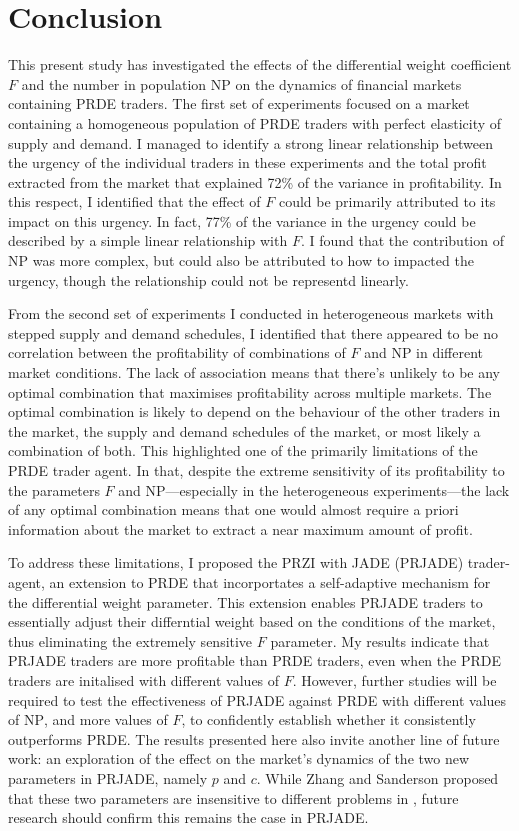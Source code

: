 \documentclass[conference]{IEEEtran}
\begin{document}
\section{Conclusion}

This present study has investigated the effects of the differential weight coefficient $F$ and the number in population $\mathrm{NP}$ on the dynamics of financial markets containing PRDE traders.
The first set of experiments focused on a market containing a homogeneous population of PRDE traders with perfect elasticity of supply and demand.
I managed to identify a strong linear relationship between the urgency of the individual traders in these experiments and the total profit extracted from the market that explained 72\% of the variance in profitability.
In this respect, I identified that the effect of $F$ could be primarily attributed to its impact on this urgency.
In fact, 77\% of the variance in the urgency could be described by a simple linear relationship with $F$.
I found that the contribution of $\mathrm{NP}$ was more complex, but could also be attributed to how to impacted the urgency, though the relationship could not be representd linearly.

From the second set of experiments I conducted in heterogeneous markets with stepped supply and demand schedules, I identified that there appeared to be no correlation between the profitability of combinations of $F$ and $\mathrm{NP}$ in different market conditions.
The lack of association means that there's unlikely to be any optimal combination that maximises profitability across multiple markets.
The optimal combination is likely to depend on the behaviour of the other traders in the market, the supply and demand schedules of the market, or most likely a combination of both.
This highlighted one of the primarily limitations of the PRDE trader agent.
In that, despite the extreme sensitivity of its profitability to the parameters $F$ and $\mathrm{NP}$---especially in the heterogeneous experiments---the lack of any optimal combination means that one would almost require a priori information about the market to extract a near maximum amount of profit.

To address these limitations, I proposed the PRZI with JADE (PRJADE) trader-agent, an extension to PRDE that incorportates a self-adaptive mechanism for the differential weight parameter.
This extension enables PRJADE traders to essentially adjust their differntial weight based on the conditions of the market, thus eliminating the extremely sensitive $F$ parameter.
My results indicate that PRJADE traders are more profitable than PRDE traders, even when the PRDE traders are initalised with different values of $F$.
However, further studies will be required to test the effectiveness of PRJADE against PRDE with different values of $\mathrm{NP}$, and more values of $F$, to confidently establish whether it consistently outperforms PRDE.
The results presented here also invite another line of future work: an exploration of the effect on the market's dynamics of the two new parameters in PRJADE, namely $p$ and $c$.
While Zhang and Sanderson proposed that these two parameters are insensitive to different problems in \cite{ZhangSanderson}, future research should confirm this remains the case in PRJADE.



\end{document}
